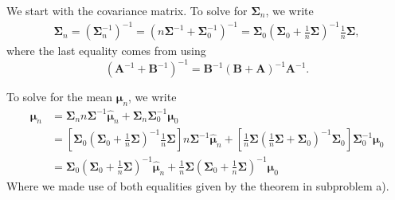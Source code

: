 \documentclass[12pt, a4paper]{article}
\newcommand{\vect}[1]{\bm{#1}}
\begin{document}
\begin{easylist}[enumerate]
	We start with the covariance matrix. 
	To solve for $\vect{\Sigma}_n$, we write
	\begin{align*}
		\vect{\Sigma}_n = \left(\vect{\Sigma}_n^{-1}\right)^{-1} = \left(  n \vect{\Sigma}^{-1} + \vect{\Sigma}_0^{-1} \right)^{-1} = 
		\vect{\Sigma}_0 \left( \vect{\Sigma}_0 + \frac{1}{n}  \vect{\Sigma} \right)^{-1} \frac{1}{n} \vect{\Sigma},
	\end{align*}
	where the last equality comes from using 
	\begin{equation*}
		\left( \vect{A}^{-1} + \vect{B}^{-1}\right)^{-1} =
		\vect{B}^{-1} \left( \vect{B} + \vect{A} \right)^{-1} \vect{A}^{-1}.
	\end{equation*}
	
	To solve for the mean $\vect{\mu}_n$, we write
	\begin{align*}
		\vect{\mu}_n 
		&= \vect{\Sigma}_n n \vect{\Sigma}^{-1} \hat{\vect{\mu}}_n 
		+
		\vect{\Sigma}_n \vect{\Sigma}^{-1}_0  \vect{\mu}_0
		\\ &=
		\left[ \vect{\Sigma}_0 \left( \vect{\Sigma}_0 + \frac{1}{n}  \vect{\Sigma} \right)^{-1} \frac{1}{n} \vect{\Sigma} \right] n \vect{\Sigma}^{-1} \hat{\vect{\mu}}_n 
		+
		\left[  \frac{1}{n} \vect{\Sigma} \left(  \frac{1}{n}  \vect{\Sigma} + \vect{\Sigma}_0  \right)^{-1}  \vect{\Sigma}_0 \right] \vect{\Sigma}^{-1}_0  \vect{\mu}_0 \\
		& = 
		 \vect{\Sigma}_0 \left( \vect{\Sigma}_0 + \frac{1}{n}  \vect{\Sigma} \right)^{-1}  \hat{\vect{\mu}}_n 
		+
		 \frac{1}{n} \vect{\Sigma} \left( \vect{\Sigma}_0 + \frac{1}{n}  \vect{\Sigma}  \right)^{-1}   \vect{\mu}_0 
	\end{align*}
	Where we made use of both equalities given by the theorem in subproblem a).
\end{easylist}
\end{document}
